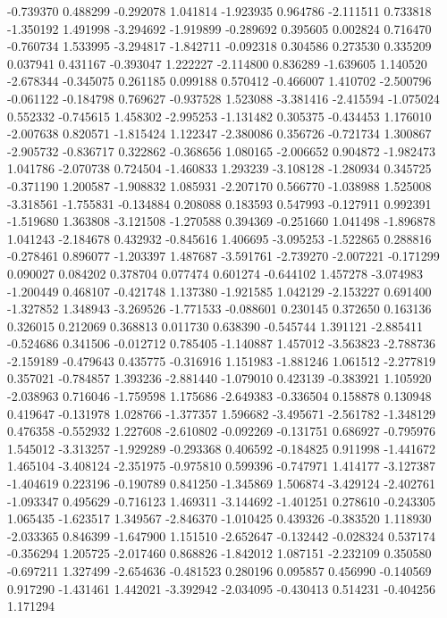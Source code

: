 -0.739370
0.488299
-0.292078
1.041814
-1.923935
0.964786
-2.111511
0.733818
-1.350192
1.491998
-3.294692
-1.919899
-0.289692
0.395605
0.002824
0.716470
-0.760734
1.533995
-3.294817
-1.842711
-0.092318
0.304586
0.273530
0.335209
0.037941
0.431167
-0.393047
1.222227
-2.114800
0.836289
-1.639605
1.140520
-2.678344
-0.345075
0.261185
0.099188
0.570412
-0.466007
1.410702
-2.500796
-0.061122
-0.184798
0.769627
-0.937528
1.523088
-3.381416
-2.415594
-1.075024
0.552332
-0.745615
1.458302
-2.995253
-1.131482
0.305375
-0.434453
1.176010
-2.007638
0.820571
-1.815424
1.122347
-2.380086
0.356726
-0.721734
1.300867
-2.905732
-0.836717
0.322862
-0.368656
1.080165
-2.006652
0.904872
-1.982473
1.041786
-2.070738
0.724504
-1.460833
1.293239
-3.108128
-1.280934
0.345725
-0.371190
1.200587
-1.908832
1.085931
-2.207170
0.566770
-1.038988
1.525008
-3.318561
-1.755831
-0.134884
0.208088
0.183593
0.547993
-0.127911
0.992391
-1.519680
1.363808
-3.121508
-1.270588
0.394369
-0.251660
1.041498
-1.896878
1.041243
-2.184678
0.432932
-0.845616
1.406695
-3.095253
-1.522865
0.288816
-0.278461
0.896077
-1.203397
1.487687
-3.591761
-2.739270
-2.007221
-0.171299
0.090027
0.084202
0.378704
0.077474
0.601274
-0.644102
1.457278
-3.074983
-1.200449
0.468107
-0.421748
1.137380
-1.921585
1.042129
-2.153227
0.691400
-1.327852
1.348943
-3.269526
-1.771533
-0.088601
0.230145
0.372650
0.163136
0.326015
0.212069
0.368813
0.011730
0.638390
-0.545744
1.391121
-2.885411
-0.524686
0.341506
-0.012712
0.785405
-1.140887
1.457012
-3.563823
-2.788736
-2.159189
-0.479643
0.435775
-0.316916
1.151983
-1.881246
1.061512
-2.277819
0.357021
-0.784857
1.393236
-2.881440
-1.079010
0.423139
-0.383921
1.105920
-2.038963
0.716046
-1.759598
1.175686
-2.649383
-0.336504
0.158878
0.130948
0.419647
-0.131978
1.028766
-1.377357
1.596682
-3.495671
-2.561782
-1.348129
0.476358
-0.552932
1.227608
-2.610802
-0.092269
-0.131751
0.686927
-0.795976
1.545012
-3.313257
-1.929289
-0.293368
0.406592
-0.184825
0.911998
-1.441672
1.465104
-3.408124
-2.351975
-0.975810
0.599396
-0.747971
1.414177
-3.127387
-1.404619
0.223196
-0.190789
0.841250
-1.345869
1.506874
-3.429124
-2.402761
-1.093347
0.495629
-0.716123
1.469311
-3.144692
-1.401251
0.278610
-0.243305
1.065435
-1.623517
1.349567
-2.846370
-1.010425
0.439326
-0.383520
1.118930
-2.033365
0.846399
-1.647900
1.151510
-2.652647
-0.132442
-0.028324
0.537174
-0.356294
1.205725
-2.017460
0.868826
-1.842012
1.087151
-2.232109
0.350580
-0.697211
1.327499
-2.654636
-0.481523
0.280196
0.095857
0.456990
-0.140569
0.917290
-1.431461
1.442021
-3.392942
-2.034095
-0.430413
0.514231
-0.404256
1.171294
